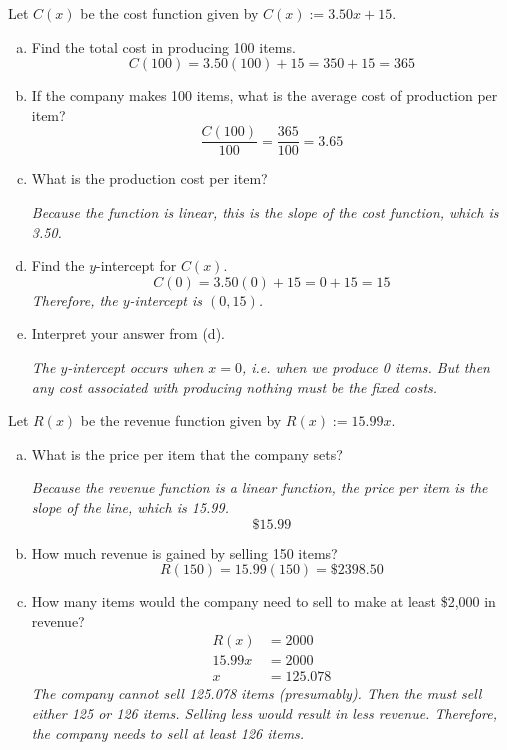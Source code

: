 \documentclass[11pt,letterpaper]{article}
\begin{document}

 Let $C(x)$ be the cost function given by $C(x):= 3.50x + 15$.
\begin{enumerate}[(a)]
\item Find the total cost in producing 100 items. \pspace
	\[
	C(100)= 3.50(100) + 15= 350 + 15= 365
	\] \pvspace{1.3cm}

\item If the company makes 100 items, what is the average cost of production per item? \pspace
	\[
	\dfrac{C(100)}{100}= \dfrac{365}{100}= 3.65
	\] \pvspace{1.1cm}

\item What is the production cost per item? \pvspace{1.2cm}

{\itshape Because the function is linear, this is the slope of the cost function, which is 3.50.} \pvspace{1.3cm}

\item Find the $y$-intercept for $C(x)$. \pspace
	\[
	C(0)= 3.50(0) + 15= 0 + 15= 15
	\]
{\itshape Therefore, the $y$-intercept is $(0, 15)$.} \pvspace{0.8cm}

\item Interpret your answer from (d). \pspace

{\itshape The $y$-intercept occurs when $x= 0$, i.e. when we produce 0 items. But then any cost associated with producing nothing must be the fixed costs.}
\end{enumerate}



\newpage



 Let $R(x)$ be the revenue function given by $R(x):= 15.99x$. 
\begin{enumerate}[(a)]
\item What is the price per item that the company sets? \pspace

{\itshape Because the revenue function is a linear function, the price per item is the slope of the line, which is 15.99.}
	\[
	\$15.99
	\] \pvspace{4.3cm}

\item How much revenue is gained by selling 150 items? \pspace
	\[
	R(150)= 15.99(150)= \$2398.50
	\] \pvspace{4.7cm}

\item How many items would the company need to sell to make at least \$2,000 in revenue? 
	\[
	\begin{aligned}
	R(x)&= 2000 \\
	15.99x&= 2000 \\
	x&= 125.078
	\end{aligned}
	\]
{\itshape The company cannot sell 125.078 items (presumably). Then the must sell either 125 or 126 items. Selling less would result in less revenue. Therefore, the company needs to sell at least 126 items.}
\end{enumerate}
\end{document}
